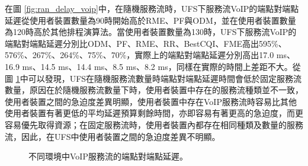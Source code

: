在圖 \ref{fig:ran_delay_voip}中，在隨機服務流時，UFS下服務流VoIP的端點對端點延遲從使用者裝置數量為90時開始高於RME、PF與ODM，並在使用者裝置數量為120時高於其他排程演算法。當使用者裝置數量為130時，UFS下服務流VoIP的端點對端點延遲分別比ODM、PF、RME、RR、BestCQI、FME高出595\%、576\%、267\%、264\%、75\%、70\%，實際上的端點對端點延遲分別高出17.0 ms、16.9 ms、14.5 ms、14.4 ms、8.5 ms、8.2 ms，同樣在實際的時間上差距不大。從圖 \ref{fig:delay_voip}中可以發現，UFS在隨機服務流數量時端點對端點延遲時間會低於固定服務流數量，原因在於隨機服務流數量下時，使用者裝置中存在的服務流種類並不一致，使用者裝置之間的急迫度差異明顯，使用者裝置中存在VoIP服務流時容易比其他使用者裝置有著更低的平均延遲預算剩餘時間，亦即容易有著更高的急迫度，而更容易優先取得資源；在固定服務流時，使用者裝置內都存在相同種類及數量的服務流，因此，在UFS中使用者裝置之間的急迫度差異不明顯。
\begin{figure}[H]
\centering
{}
\caption{\label{fig:delay_voip}不同環境中VoIP服務流的端點對端點延遲。}
\end{figure}
